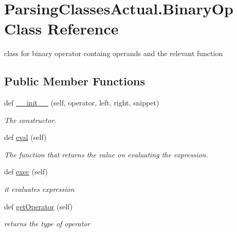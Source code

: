 \hypertarget{class_parsing_classes_actual_1_1_binary_op}{}\section{Parsing\+Classes\+Actual.\+Binary\+Op Class Reference}
\label{class_parsing_classes_actual_1_1_binary_op}


class for binary operator containg operands and the relevant function  


\subsection*{Public Member Functions}
\begin{DoxyCompactItemize}
\item 
def \hyperlink{class_parsing_classes_actual_1_1_binary_op_a3d8482575f41d191640a397be6806991}{\+\_\+\+\_\+init\+\_\+\+\_\+} (self, operator, left, right, snippet)
\begin{DoxyCompactList}\small\item\em The constructor. \end{DoxyCompactList}\item 
\mbox{\label{class_parsing_classes_actual_1_1_binary_op_a27757ec13077dda98775d2e3c6a29f65}} 
def \hyperlink{class_parsing_classes_actual_1_1_binary_op_a27757ec13077dda98775d2e3c6a29f65}{eval} (self)
\begin{DoxyCompactList}\small\item\em The function that returns the value on evaluating the expression. \end{DoxyCompactList}\item 
\mbox{\label{class_parsing_classes_actual_1_1_binary_op_a6ba5fdbdcda94f4f07e7d6c2f4438322}} 
def \hyperlink{class_parsing_classes_actual_1_1_binary_op_a6ba5fdbdcda94f4f07e7d6c2f4438322}{exec} (self)
\begin{DoxyCompactList}\small\item\em it evaluates expression \end{DoxyCompactList}\item 
\mbox{\label{class_parsing_classes_actual_1_1_binary_op_ae926977b3df2b3567ccd6389e595d326}} 
def \hyperlink{class_parsing_classes_actual_1_1_binary_op_ae926977b3df2b3567ccd6389e595d326}{get\+Operator} (self)
\begin{DoxyCompactList}\small\item\em returns the type of operator \end{DoxyCompactList}\end{DoxyCompactItemize}
